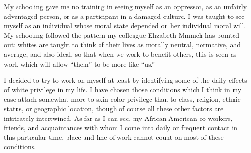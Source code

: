 \documentclass{article}
\begin{document}
My schooling gave me no training in seeing myself as an oppressor, as an
unfairly advantaged person, or as a participant in a damaged culture. I was
taught to see myself as an individual whose moral state depended on her
individual moral will. My schooling followed the pattern my colleague Elizabeth
Minnich has pointed out: whites are taught to think of their lives as morally
neutral, normative, and average, and also ideal, so that when we work to
benefit others, this is seen as work which will allow ``them'' to be more like
``us.''

I decided to try to work on myself at least by identifying some of the daily
effects of white privilege in my life. I have chosen those conditions which I
think in my case attach somewhat more to skin-color privilege than to class,
religion, ethnic status, or geographic location, though of course all these
other factors are intricately intertwined. As far as I can see, my African
American co-workers, friends, and acquaintances with whom I come into daily or
frequent contact in this particular time, place and line of work cannot count
on most of these conditions.
\end{document}
